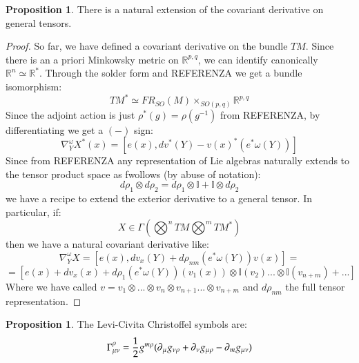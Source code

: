 \documentclass[12pt,a4paper]{report}
\theoremstyle{definition}
\theoremstyle{Theorem}
\newtheorem{Prop}[Def]{Proposition}
\theoremstyle{break}
\theoremstyle{definition}
\begin{document}
		\begin{Prop}
			There is a natural extension of the covariant derivative on general tensors.
		\end{Prop}
		\begin{proof}
			So far, we have defined a covariant derivative on the bundle $TM$. Since there is an a priori Minkowsky metric on $\mathbb{R}^{p,q}$, we can identify canonically $\mathbb{R}^n\simeq \mathbb{R}^*$. Through the solder form and REFERENZA we get a bundle isomorphism:
			$$TM^*\simeq FR_{SO}(M)\times_{SO(p,q)} \mathbb{R}^{p,q}$$
			Since the adjoint action is just $\rho^*(g)=\rho(g^{-1})$ from REFERENZA, by differentiating we get a $(-)$ sign:
			$$\nabla_Y^\omega X^*(x)=[e(x),dv^*(Y)-v(x)^*(e^*\omega(Y))]$$
			Since from REFERENZA any representation of Lie algebras naturally extends to the tensor product space as fwollows (by abuse of notation):
			$$d\rho_1\otimes d\rho_2=d\rho_1\otimes \mathbb{I}+\mathbb{I}\otimes d\rho_2$$
			we have a recipe to extend the exterior derivative to a general tensor. In particular, if:
			$$X\in\Gamma(\bigotimes^n TM\bigotimes^m TM^*)$$
			then we have a natural covariant derivative like:
			$$\nabla_Y^\omega X=[e(x),dv_x(Y)+d\rho_{nm}(e^*\omega(Y))v(x)]=$$$$=[e(x)+dv_x(x)+d\rho_1(e^*\omega(Y))(v_1(x))\otimes\mathbb{I}(v_2)...\otimes\mathbb{I}(v_{n+m})+...]$$
			Where we have called $v=v_1\otimes...\otimes v_n\otimes v_{n+1}...\otimes v_{n+m}$ and $d\rho_{nm}$ the full tensor representation.
		\end{proof}
		\begin{Prop}
			The Levi-Civita Christoffel symbols are:
			$$\Gamma^\rho_{\mu\nu}={1\over 2}g^{m\rho}(\partial_\mu g_{\nu\rho}+\partial_\nu g_{\mu\rho}-\partial_m g_{\mu\nu})$$
		\end{Prop}
\end{document}
